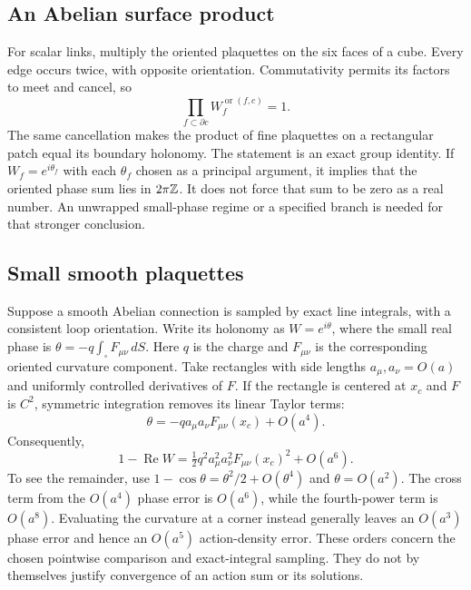 \subsection{An Abelian surface product}

For scalar links, multiply the oriented plaquettes on the six faces of a cube. Every edge occurs twice, with opposite orientation. Commutativity permits its factors to meet and cancel, so
\begin{equation}\label{g:abelian-cube}
 \prod_{f\subset\partial c}W_f^{\operatorname{or}(f,c)}=1.
\end{equation}
The same cancellation makes the product of fine plaquettes on a rectangular patch equal its boundary holonomy. The statement is an exact group identity. If $W_f=e^{i\theta_f}$ with each $\theta_f$ chosen as a principal argument, it implies that the oriented phase sum lies in $2\pi\mathbb Z$. It does not force that sum to be zero as a real number. An unwrapped small-phase regime or a specified branch is needed for that stronger conclusion.


\subsection{Small smooth plaquettes}

Suppose a smooth Abelian connection is sampled by exact line integrals, with a consistent loop orientation. Write its holonomy as $W=e^{i\theta}$, where the small real phase is $\theta=-q\int_{\square}F_{\mu\nu}\,dS$. Here $q$ is the charge and $F_{\mu\nu}$ is the corresponding oriented curvature component. Take rectangles with side lengths $a_\mu,a_\nu=O(a)$ and uniformly controlled derivatives of $F$. If the rectangle is centered at $x_c$ and $F$ is $C^2$, symmetric integration removes its linear Taylor terms:
\begin{equation}\label{g:centered-plaquette}
 \theta=-qa_\mu a_\nu F_{\mu\nu}(x_c)+O(a^4).
\end{equation}
Consequently,
\begin{equation}\label{g:wilson-expansion}
 1-\operatorname{Re}W
 =\tfrac12q^2a_\mu^2a_\nu^2 F_{\mu\nu}(x_c)^2+O(a^6).
\end{equation}
To see the remainder, use $1-\cos\theta=\theta^2/2+O(\theta^4)$ and $\theta=O(a^2)$. The cross term from the $O(a^4)$ phase error is $O(a^6)$, while the fourth-power term is $O(a^8)$. Evaluating the curvature at a corner instead generally leaves an $O(a^3)$ phase error and hence an $O(a^5)$ action-density error. These orders concern the chosen pointwise comparison and exact-integral sampling. They do not by themselves justify convergence of an action sum or its solutions.



